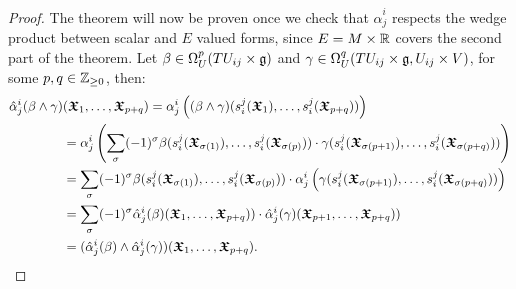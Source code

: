 \begin{proof}
The theorem will now be proven once we check that $\hat \alpha^i_j$ respects the wedge product between scalar and $E$ valued forms, since $E = M \times \mathbb{R}$ covers the second part of the theorem. Let $\beta \in \Omega^p_U(TU_{ij}\times \mathfrak{g})$ and $\gamma \in \Omega^q_U(TU_{ij}\times \mathfrak{g}, U_{ij} \times V)$, for some $p, q \in \mathbb{Z}_{\geq 0}$, then:
\begin{align*}
    \hat \alpha^i_j(\beta \wedge \gamma)&(\bm{\mathfrak{X}}_1, \dots, \bm{\mathfrak{X}}_{p+q}) 
    = \alpha^i_j\left( (\beta \wedge \gamma)(s^j_i(\bm{\mathfrak{X}}_1), \dots, s^j_i(\bm{\mathfrak{X}}_{p+q})) \right) \\
    &= \alpha^i_j\left( \sum_{\sigma}(-1)^\sigma \beta(s^j_i(\bm{\mathfrak{X}}_{\sigma(1)}), \dots, s^j_i(\bm{\mathfrak{X}}_{\sigma(p)})) \cdot \gamma(s^j_i(\bm{\mathfrak{X}}_{\sigma(p+1)}), \dots, s^j_i(\bm{\mathfrak{X}}_{\sigma(p+q)})) \right) \\
    &=  \sum_{\sigma}(-1)^\sigma \beta(s^j_i(\bm{\mathfrak{X}}_{\sigma(1)}), \dots, s^j_i(\bm{\mathfrak{X}}_{\sigma(p)})) \cdot \alpha^i_j\left(\gamma(s^j_i(\bm{\mathfrak{X}}_{\sigma(p+1)}), \dots, s^j_i(\bm{\mathfrak{X}}_{\sigma(p+q)}))\right) \\
    &= \sum_{\sigma}(-1)^\sigma \hat \alpha^i_j(\beta)(\bm{\mathfrak{X}}_1, \dots, \bm{\mathfrak{X}}_{p+q})) \cdot \hat \alpha^i_j(\gamma)(\bm{\mathfrak{X}}_{p+1}, \dots, \bm{\mathfrak{X}}_{p+q}))\\
    &= (\hat \alpha^i_j(\beta) \wedge \hat \alpha^i_j(\gamma))(\bm{\mathfrak{X}}_1, \dots, \bm{\mathfrak{X}}_{p+q}).
\end{align*}

\end{proof}

